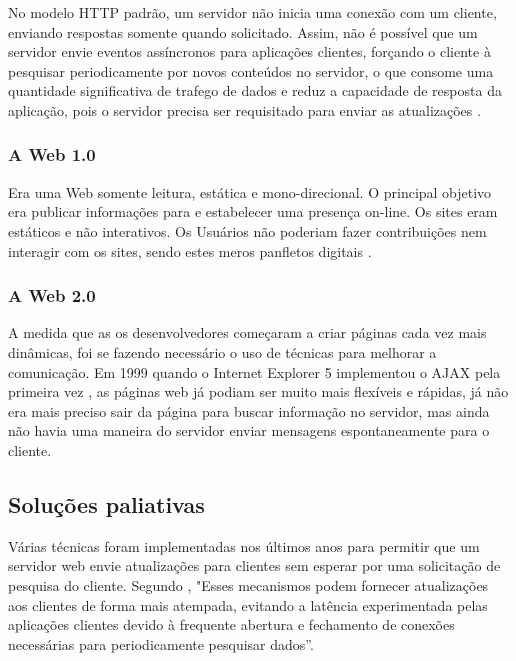 No modelo HTTP padrão, um servidor não inicia uma conexão com um cliente, enviando respostas somente quando solicitado. Assim, não é possível que um servidor envie eventos assíncronos para aplicações clientes, forçando o cliente à pesquisar periodicamente por novos conteúdos no servidor, o que consome uma quantidade significativa de trafego de dados e reduz a capacidade de resposta da aplicação, pois o servidor precisa ser requisitado para enviar as atualizações \citep{Loreto2011}.

\subsubsection{A Web 1.0}
Era uma Web somente leitura, estática e mono-direcional. O principal objetivo era publicar informações para e estabelecer uma presença on-line. Os sites eram estáticos e não interativos. Os Usuários não poderiam fazer contribuições nem interagir com os sites, sendo estes meros panfletos digitais \citep[p.~2-3]{Aghaei2012}.

\subsubsection{A Web 2.0}
A medida que as os desenvolvedores começaram a criar páginas cada vez mais dinâmicas, foi se fazendo necessário o uso de técnicas para melhorar a comunicação. Em 1999 quando o Internet Explorer 5 implementou o AJAX pela primeira vez \citep{Asleson2006}, as páginas web já podiam ser muito mais flexíveis e rápidas, já não era mais preciso sair da página para buscar informação no servidor, mas ainda não havia uma maneira do servidor enviar mensagens espontaneamente para o cliente.


\subsection{Soluções paliativas}

Várias técnicas foram implementadas nos últimos anos para permitir que um servidor web envie atualizações para clientes sem esperar por uma solicitação de pesquisa do cliente. Segundo \citet[p.~3]{Loreto2011}, "Esses mecanismos podem fornecer atualizações aos clientes de forma mais atempada, evitando a latência experimentada pelas aplicações clientes devido à frequente abertura e fechamento de conexões necessárias para periodicamente pesquisar dados”.

